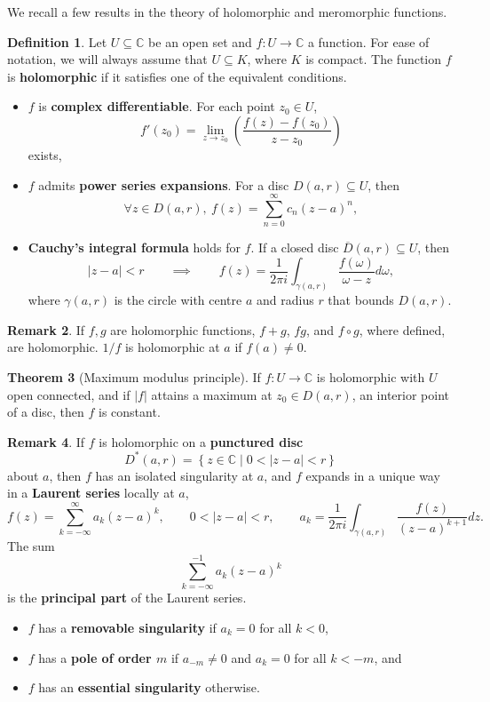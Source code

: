 \documentclass{article}
\newcommand{\C}{\mathbb{C}}
\newcommand{\rb}[1]{\left( #1 \right)}
\newcommand{\cb}[1]{\left\{ #1 \right\}}
\newcommand{\abs}[1]{\left\lvert #1 \right\rvert}
\theoremstyle{definition}\newtheorem{definition}{Definition}[section]
\theoremstyle{definition}\newtheorem{notation}[definition]{Notation}
\theoremstyle{definition}\newtheorem{remark}[definition]{Remark}
\theoremstyle{definition}\newtheorem{example1}[definition]{Example}
\theoremstyle{definition}\newtheorem{fact}{Fact}
\theoremstyle{definition}\newtheorem{exercise}{Exercise}
\theoremstyle{definition}\newtheorem*{example2}{Example}
\newtheorem{theorem}[definition]{Theorem}
\begin{document}
We recall a few results in the theory of holomorphic and meromorphic functions.

\begin{definition}
Let $ U \subseteq \C $ be an open set and $ f : U \to \C $ a function. For ease of notation, we will always assume that $ U \subseteq K $, where $ K $ is compact. The function $ f $ is \textbf{holomorphic} if it satisfies one of the equivalent conditions.
\begin{itemize}
\item $ f $ is \textbf{complex differentiable}. For each point $ z_0 \in U $,
$$ f'\rb{z_0} = \lim_{z \to z_0}\rb{\dfrac{f\rb{z} - f\rb{z_0}}{z - z_0}} $$
exists,
\item $ f $ admits \textbf{power series expansions}. For a disc $ D\rb{a, r} \subseteq U $, then
$$ \forall z \in D\rb{a, r}, \ f\rb{z} = \sum_{n = 0}^\infty c_n\rb{z - a}^n, $$
\item \textbf{Cauchy's integral formula} holds for $ f $. If a closed disc $ \overline{D}\rb{a, r} \subseteq U $, then
$$ \abs{z - a} < r \qquad \implies \qquad f\rb{z} = \dfrac{1}{2\pi i} \int_{\gamma\rb{a, r}} \dfrac{f\rb{\omega}}{\omega - z} d\omega, $$
where $ \gamma\rb{a, r} $ is the circle with centre $ a $ and radius $ r $ that bounds $ D\rb{a, r} $.
\end{itemize}
\end{definition}

\begin{remark}
If $ f, g $ are holomorphic functions, $ f + g $, $ fg $, and $ f \circ g $, where defined, are holomorphic. $ 1 / f $ is holomorphic at $ a $ if $ f\rb{a} \ne 0 $.
\end{remark}

\begin{theorem}[Maximum modulus principle]
If $ f : U \to \C $ is holomorphic with $ U $ open connected, and if $ \abs{f} $ attains a maximum at $ z_0 \in D\rb{a, r} $, an interior point of a disc, then $ f $ is constant.
\end{theorem}

\begin{remark}
If $ f $ is holomorphic on a \textbf{punctured disc}
$$ D^*\rb{a, r} = \cb{z \in \C \mid 0 < \abs{z - a} < r} $$
about $ a $, then $ f $ has an isolated singularity at $ a $, and $ f $ expands in a unique way in a \textbf{Laurent series} locally at $ a $,
$$ f\rb{z} = \sum_{k = -\infty}^\infty a_k\rb{z - a}^k, \qquad 0 < \abs{z - a} < r, \qquad a_k = \dfrac{1}{2\pi i} \int_{\gamma\rb{a, r}} \dfrac{f\rb{z}}{\rb{z - a}^{k + 1}} dz. $$
The sum
$$ \sum_{k = -\infty}^{-1} a_k\rb{z - a}^k $$
is the \textbf{principal part} of the Laurent series.
\begin{itemize}
\item $ f $ has a \textbf{removable singularity} if $ a_k = 0 $ for all $ k < 0 $,
\item $ f $ has a \textbf{pole of order $ m $} if $ a_{-m} \ne 0 $ and $ a_k = 0 $ for all $ k < -m $, and
\item $ f $ has an \textbf{essential singularity} otherwise.
\end{itemize}
\end{remark}
\end{document}
